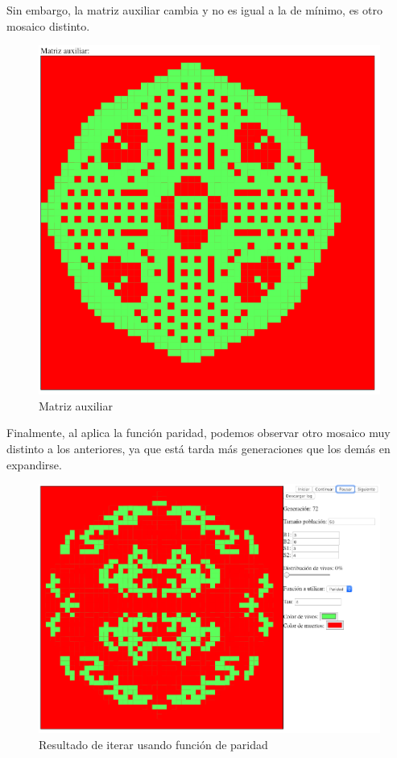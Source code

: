 	Sin embargo, la matriz auxiliar cambia y no es igual a la de mínimo, es otro mosaico distinto.
	\begin{figure}[H]
		\begin{center}
			\includegraphics[scale=.3]{GOLM/img/regla3634-2-1.png}
			\caption{Matriz auxiliar}
			\label{fig:golm12}
		\end{center}
	\end{figure}


	Finalmente, al aplica la función paridad, podemos observar otro mosaico muy distinto a los anteriores, ya que está tarda más generaciones que los demás en expandirse.
	\begin{figure}[H]
		\begin{center}
			\includegraphics[scale=.3]{GOLM/img/regla3634-3.png}
			\caption{Resultado de iterar usando función de paridad}
			\label{fig:golm13}
		\end{center}
	\end{figure}

